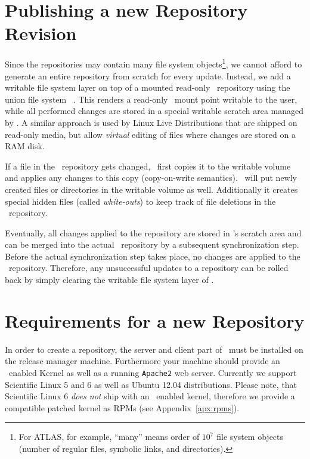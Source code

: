 \section{Publishing a new Repository Revision}
\label{sct:repoupdate}

Since the repositories may contain many file system objects\footnote{For ATLAS, for example, ``many'' means order of $10^7$ file system objects (\ie number of regular files, symbolic links, and directories).}, we cannot afford to generate an entire repository from scratch for every update.
Instead, we add a writable file system layer on top of a mounted read-only \cvmfs\ repository using the union file system \aufs~\cite{aufs}.
This renders a read-only \cvmfs\ mount point writable to the user, while all performed changes are stored in a special writable scratch area managed by \aufs.
A similar approach is used by Linux Live Distributions that are shipped on read-only media, but allow \emph{virtual} editing of files where changes are stored on a RAM disk.

If a file in the \cvmfs\ repository gets changed, \aufs\ first copies it to the writable volume and applies any changes to this copy (copy-on-write semantics).
\aufs\ will put newly created files or directories in the writable volume as well.
Additionally it creates special hidden files (called \emph{white-outs}) to keep track of file deletions in the \cvmfs\ repository.

Eventually, all changes applied to the repository are stored in \aufs's scratch area and can be merged into the actual \cvmfs\ repository by a subsequent synchronization step.
Before the actual synchronization step takes place, no changes are applied to the \cvmfs\ repository.
Therefore, any unsuccessful updates to a repository can be rolled back by simply clearing the writable file system layer of \aufs.

\section{Requirements for a new Repository}
\label{sct:newreporequirements}

In order to create a repository, the server and client part of \cvmfs\ must be installed on the release manager machine.
Furthermore your machine should provide an \aufs\ enabled Kernel as well as a running \texttt{Apache2} web server.
Currently we support Scientific Linux 5 and 6 as well as Ubuntu 12.04 distributions.
Please note, that Scientific Linux 6 \emph{does not} ship with an \aufs\ enabled kernel, therefore we provide a compatible patched kernel as RPMs (see Appendix~\ref{apx:rpms}).

